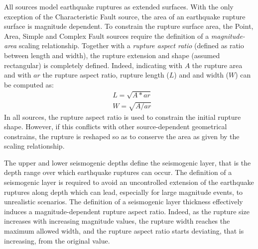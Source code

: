 All sources model earthquake ruptures as extended surfaces. With the only exception of the Characteristic Fault source, the area of an earthquake rupture surface is magnitude dependent. To constrain the rupture surface area, the Point, Area, Simple and Complex Fault sources require the definition of a \textit{magnitude-area} scaling relationship. Together with a \textit{rupture aspect ratio} (defined as ratio between length and width), the rupture extension and shape (assumed rectangular) is completely defined. Indeed, indicating with $A$ the rupture area and with $ar$ the rupture aspect ratio, rupture length ($L$) and and width ($W$) can be computed as:
\begin{equation}
\begin{split} \label{eq:rup_l_w}
&L = \sqrt{A * ar}  \\
&W = \sqrt{A / ar}
\end{split}
\end{equation}
In all sources, the rupture aspect ratio is used to constrain the initial rupture shape. However, if this conflicts with other source-dependent geometrical constrains, the rupture is reshaped so as to conserve the area as given by the scaling relationship.

The upper and lower seismogenic depths define the seismogenic layer, that is the depth range over which earthquake ruptures can occur. The definition of a seismogenic layer is required to avoid an uncontrolled extension of the earthquake ruptures along depth which can lead, especially for large magnitude events, to unrealistic scenarios. The definition of a seismogenic layer thickness effectively induces a magnitude-dependent rupture aspect ratio. Indeed, as the rupture size increases with increasing magnitude values, the rupture width reaches the maximum allowed width, and the rupture aspect ratio starts deviating, that is increasing, from the original value.

